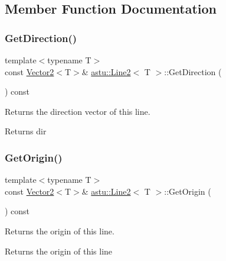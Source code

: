\subsection{Member Function Documentation}
\mbox{\label{classastu_1_1Line2_aa0ff02dd1daa9ef61fe0a45bf636ddff}} 
\subsubsection{\texorpdfstring{Get\+Direction()}{GetDirection()}}
{\footnotesize\ttfamily template$<$typename T$>$ \\
const \hyperlink{classastu_1_1Vector2}{Vector2}$<$T$>$\& \hyperlink{classastu_1_1Line2}{astu\+::\+Line2}$<$ T $>$\+::Get\+Direction (\begin{DoxyParamCaption}{ }\end{DoxyParamCaption}) const\hspace{0.3cm}{\ttfamily [inline]}}

Returns the direction vector of this line.

\begin{DoxyReturn}{Returns}
dir 
\end{DoxyReturn}
\mbox{\label{classastu_1_1Line2_a73735aa5c8dbb21aa8e245e9170a9a47}} 
\subsubsection{\texorpdfstring{Get\+Origin()}{GetOrigin()}}
{\footnotesize\ttfamily template$<$typename T$>$ \\
const \hyperlink{classastu_1_1Vector2}{Vector2}$<$T$>$\& \hyperlink{classastu_1_1Line2}{astu\+::\+Line2}$<$ T $>$\+::Get\+Origin (\begin{DoxyParamCaption}{ }\end{DoxyParamCaption}) const\hspace{0.3cm}{\ttfamily [inline]}}

Returns the origin of this line.

\begin{DoxyReturn}{Returns}
the origin of this line 
\end{DoxyReturn}
\mbox{\label{classastu_1_1Line2_aab676ad8791895a35cb573df0d0b4912}} 
